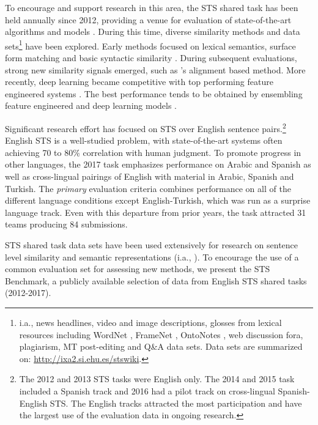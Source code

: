 \documentclass[11pt,a4paper]{article}
\begin{document}
To encourage and support research in this area, the STS shared task has been held annually since 2012, providing a venue for evaluation of state-of-the-art algorithms and models \cite{agirre-EtAl:2012:STARSEM-SEMEVAL,agirre-EtAl:2013:*SEM1,agirre-EtAl:2014:SemEval,agirre-EtAl:2015:SemEval,agirre-EtAl:2016:SemEval1}. During this time, diverse similarity methods and data sets\footnote{i.a., news headlines, video and image descriptions, glosses from lexical resources including WordNet \cite{Miller1995,Fellbaum:98}, FrameNet \cite{Baker:98}, OntoNotes \cite{Hovy:06}, web discussion fora, plagiarism, MT post-editing and Q\&A data sets. Data sets are summarized on: \url{http://ixa2.si.ehu.es/stswiki}.} have been explored.
Early methods focused on lexical semantics, surface form matching and basic syntactic similarity \cite{bar-EtAl:2012:STARSEM-SEMEVAL,vsaric-EtAl:2012:STARSEM-SEMEVAL,jimenez-becerra-gelbukh:2012:STARSEM-SEMEVAL1}. During subsequent evaluations, strong new similarity signals emerged, such as 's alignment based method. More recently, deep learning became competitive with top performing feature engineered systems \cite{He2016}. The best performance tends to be obtained by ensembling feature engineered and deep learning models \cite{Rychalska2016}. 

Significant research effort has focused on STS over English sentence pairs.\footnote{The 2012 and 2013 STS tasks were English only. The 2014 and 2015 task included a Spanish track and 2016 had a pilot track on cross-lingual Spanish-English STS. The English tracks attracted the most participation and have the largest use of the evaluation data in ongoing research.} English STS is a well-studied problem, with state-of-the-art systems often achieving 70 to 80\% correlation with human judgment. To promote progress in other languages, the 2017 task emphasizes performance on Arabic and Spanish as well as cross-lingual pairings of English with material in Arabic, Spanish and Turkish. The \textit{primary} evaluation criteria combines performance on all of the different language conditions except English-Turkish, which was run as a surprise language track. Even with this departure from prior years, the task attracted 31 teams producing 84 submissions.

STS shared task data sets have been used extensively for research on sentence level similarity and semantic representations (i.a., ). To encourage the use of a common evaluation set for assessing new methods, we present the STS Benchmark, a publicly available selection of data from English STS shared tasks (2012-2017).
\end{document}
